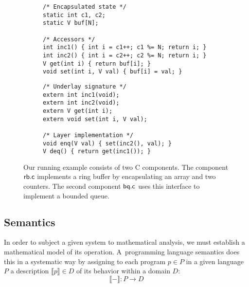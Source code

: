 \documentclass[sigplan,10pt,authordraft]{acmart}
\begin{document}
\begin{figure*} %
  \centering
  \begin{subfigure}{0.45\textwidth}
\begin{verbatim}
/* Encapsulated state */
static int c1, c2;
static V buf[N];

/* Accessors */
int inc1() { int i = c1++; c1 %= N; return i; }
int inc2() { int i = c2++; c2 %= N; return i; }
V get(int i) { return buf[i]; }
void set(int i, V val) { buf[i] = val; }
\end{verbatim}
  \label{fig:rb}
  \end{subfigure}
  \hspace{4em}
  \begin{subfigure}{0.36\textwidth}
\begin{verbatim}
/* Underlay signature */
extern int inc1(void);
extern int inc2(void);
extern V get(int i);
extern void set(int i, V val);

/* Layer implementation */
void enq(V val) { set(inc2(), val); }
V deq() { return get(inc1()); }
\end{verbatim}
  \label{fig:bq}
  \end{subfigure}
  \caption{Our running example consists of two C components.
    The component $ \mathsf{rb.c} $
    implements a ring buffer by encapsulating an array
    and two counters. The second component
    $ \mathsf{bq.c} $ uses this interface to implement a
    bounded queue.}
  \label{fig:code}
\end{figure*}

\subsection{Semantics} %

In order to subject a given system to mathematical analysis,
we must establish a mathematical model of its operation.
A~programming language semantics
does this in a systematic way
by assigning to each program $p \in P$
in a given language $P$
a description $\llbracket p \rrbracket \in D$
of its behavior within a domain $D$:
\[
    \llbracket {-} \rrbracket : P \rightarrow D
\]
\end{document}
